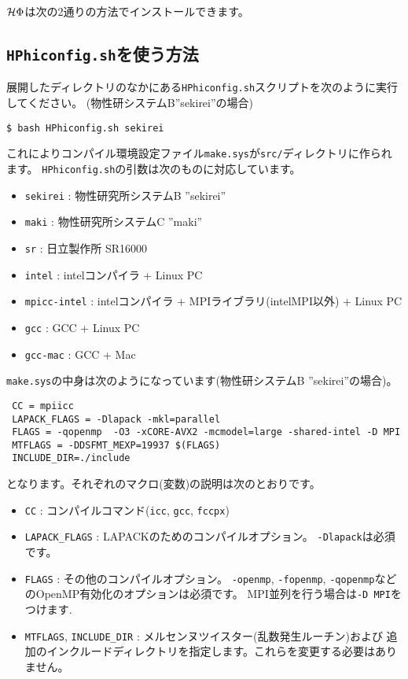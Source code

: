 $\mathcal{H} \Phi$は次の2通りの方法でインストールできます。

\subsection{\texttt{HPhiconfig.sh}を使う方法}

展開したディレクトリのなかにある\verb|HPhiconfig.sh|スクリプトを次のように実行してください。
(物性研システムB''sekirei''の場合)
\begin{verbatim}
$ bash HPhiconfig.sh sekirei
\end{verbatim}
これによりコンパイル環境設定ファイル\verb|make.sys|が\verb|src/|ディレクトリに作られます。
\verb|HPhiconfig.sh|の引数は次のものに対応しています。
\begin{itemize}
\item \verb|sekirei| : 物性研究所システムB ''sekirei''
\item \verb|maki| : 物性研究所システムC ''maki''
\item \verb|sr| : 日立製作所 SR16000
\item \verb|intel| : intelコンパイラ + Linux PC
\item \verb|mpicc-intel| : intelコンパイラ + MPIライブラリ(intelMPI以外) + Linux PC
\item \verb|gcc| : GCC + Linux PC
\item \verb|gcc-mac| : GCC + Mac
\end{itemize}

\verb|make.sys|の中身は次のようになっています(物性研システムB ''sekirei''の場合)。
\begin{verbatim}
 CC = mpiicc
 LAPACK_FLAGS = -Dlapack -mkl=parallel 
 FLAGS = -qopenmp  -O3 -xCORE-AVX2 -mcmodel=large -shared-intel -D MPI
 MTFLAGS = -DDSFMT_MEXP=19937 $(FLAGS)
 INCLUDE_DIR=./include
\end{verbatim}
となります。それぞれのマクロ(変数)の説明は次のとおりです。
\begin{itemize}
\item \verb|CC| : コンパイルコマンド(\verb|icc|, \verb|gcc|, \verb|fccpx|)
\item \verb|LAPACK_FLAGS| : LAPACKのためのコンパイルオプション。 \verb|-Dlapack|は必須です。
\item \verb|FLAGS| : その他のコンパイルオプション。
  \verb|-openmp|, \verb|-fopenmp|, \verb|-qopenmp|などのOpenMP有効化のオプションは必須です。
  MPI並列を行う場合は\verb|-D MPI|をつけます. 
\item \verb|MTFLAGS|, \verb|INCLUDE_DIR| : メルセンヌツイスター(乱数発生ルーチン)および
  追加のインクルードディレクトリを指定します。これらを変更する必要はありません。
\end{itemize}

